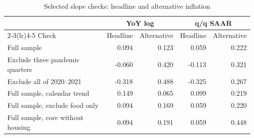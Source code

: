 \begin{table}[htbp]
\centering\small
\caption{Selected slope checks: headline and alternative inflation}
\begin{tabularx}{\linewidth}{Xrrrr}
\toprule
&\multicolumn{2}{c}{YoY log}&\multicolumn{2}{c}{q/q SAAR}\\
\cmidrule(lr){2-3}\cmidrule(lr){4-5}
Check &Headline&Alternative&Headline&Alternative\\
\midrule
Full sample & 0.094 & 0.123 & 0.059 & 0.222\\
Exclude three pandemic quarters & -0.060 & 0.420 & -0.113 & 0.321\\
Exclude all of 2020--2021 & -0.318 & 0.488 & -0.325 & 0.267\\
Full sample, calendar trend & 0.149 & 0.065 & 0.099 & 0.219\\
Full sample, exclude food only & 0.094 & 0.169 & 0.059 & 0.220\\
Full sample, core without housing & 0.094 & 0.191 & 0.059 & 0.448\\
\bottomrule
\end{tabularx}
\end{table}
